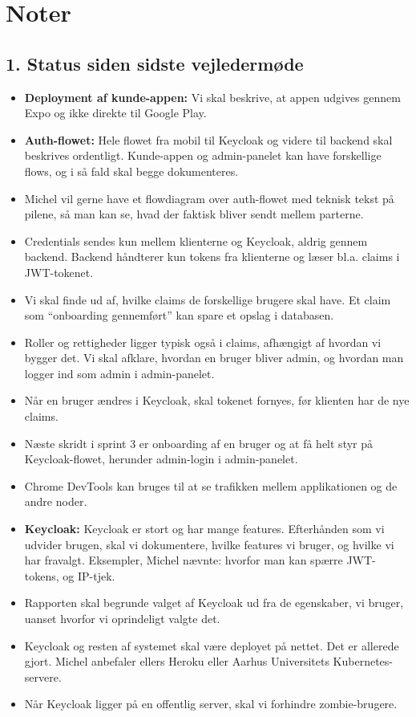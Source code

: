 \documentclass[a4paper,11pt]{article}
\begin{document}
\section*{Noter}
\subsection*{1. Status siden sidste vejledermøde}

\begin{itemize}
    \item \textbf{Deployment af kunde-appen:} Vi skal beskrive, at appen udgives gennem Expo og ikke direkte til Google Play.
    \item \textbf{Auth-flowet:} Hele flowet fra mobil til Keycloak og videre til backend skal beskrives ordentligt. Kunde-appen og admin-panelet kan have forskellige flows, og i så fald skal begge dokumenteres.
    \item Michel vil gerne have et flowdiagram over auth-flowet med teknisk tekst på pilene, så man kan se, hvad der faktisk bliver sendt mellem parterne.
    \item Credentials sendes kun mellem klienterne og Keycloak, aldrig gennem backend. Backend håndterer kun tokens fra klienterne og læser bl.a. claims i JWT-tokenet.
    \item Vi skal finde ud af, hvilke claims de forskellige brugere skal have. Et claim som ``onboarding gennemført'' kan spare et opslag i databasen.
    \item Roller og rettigheder ligger typisk også i claims, afhængigt af hvordan vi bygger det. Vi skal afklare, hvordan en bruger bliver admin, og hvordan man logger ind som admin i admin-panelet.
    \item Når en bruger ændres i Keycloak, skal tokenet fornyes, før klienten har de nye claims.
    \item Næste skridt i sprint 3 er onboarding af en bruger og at få helt styr på Keycloak-flowet, herunder admin-login i admin-panelet.
    \item Chrome DevTools kan bruges til at se trafikken mellem applikationen og de andre noder.
    \item \textbf{Keycloak:} Keycloak er stort og har mange features. Efterhånden som vi udvider brugen, skal vi dokumentere, hvilke features vi bruger, og hvilke vi har fravalgt. Eksempler, Michel nævnte: hvorfor man kan spærre JWT-tokens, og IP-tjek.
    \item Rapporten skal begrunde valget af Keycloak ud fra de egenskaber, vi bruger, uanset hvorfor vi oprindeligt valgte det.
    \item Keycloak og resten af systemet skal være deployet på nettet. Det er allerede gjort. Michel anbefaler ellers Heroku eller Aarhus Universitets Kubernetes-servere.
    \item Når Keycloak ligger på en offentlig server, skal vi forhindre zombie-brugere.
\end{itemize}
\end{document}
